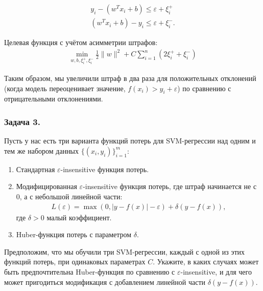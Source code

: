\begin{align*}
    y_i - (w^Tx_i + b) \leq \varepsilon + \xi_i^+ \\
    (w^Tx_i + b) - y_i \leq \varepsilon + \xi_i^-.
\end{align*}

Целевая функция с учётом асимметрии штрафов:
\begin{align*}
    \min_{w, b, \xi_i^+, \xi_i^-} \frac{1}{2} \| w \|^2 + C \sum\limits_{i = 1}^n (2\xi_i^+ + \xi_i^-)
\end{align*}

Таким образом, мы увеличили штраф в два раза для положительных отклонений (когда модель переоценивает значение, \(f(x_i) > y_i +\varepsilon\)) по сравнению с отрицательными отклонениями.

\subsubsection{Задача 3.}
Пусть у нас есть три варианта функций потерь для SVM-регрессии над одним и тем же набором данных \(\{(x_i, y_i)\}_{i=1}^m\):
\begin{enumerate}
    \item Стандартная \(\varepsilon\)-insensitive функция потерь.
    \item Модифицированная \(\varepsilon\)-insensitive функция потерь, где штраф начинается не с \(0\), а с небольшой линейной части:
          \begin{align*}
              L(\varepsilon) = \max(0, | y - f(x) | - \varepsilon) + \delta(y - f(x)),
          \end{align*}
          где \(\delta > 0\) малый коэффициент.

    \item Huber-функция потерь с параметром \(\delta\).
\end{enumerate}

Предположим, что мы обучили три SVM-регрессии, каждый с одной из этих функций потерь, при одинаковых параметрах \(C\). Укажите, в каких случаях может быть предпочтительна Huber-функция по сравнению с
\(\varepsilon\)-insensitive, и для чего может пригодиться модификация с добавлением линейной части \(\delta(y - f(x))\).

